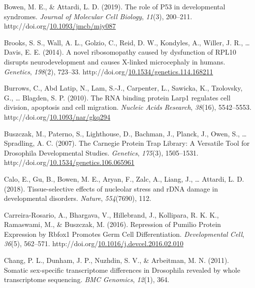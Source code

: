 \documentclass[12pt,oneside]{reedthesis}
\newlength{\cslhangindent}
\newenvironment{CSLReferences}[2] %
 {%
  \setlength{\parindent}{0pt}
  \ifodd #1 \everypar{\setlength{\hangindent}{\cslhangindent}}\ignorespaces\fi
  \ifnum #2 > 0
  \setlength{\parskip}{#2\baselineskip}
  \fi
 }%
 {}
\begin{document}
\begin{CSLReferences}{1}{0}
\leavevmode{}%
Bowen, M. E., \& Attardi, L. D. (2019). The role of P53 in developmental syndromes. \emph{Journal of Molecular Cell Biology}, \emph{11}(3), 200--211. http://doi.org/\href{https://doi.org/10.1093/jmcb/mjy087}{10.1093/jmcb/mjy087}

\leavevmode{}%
Brooks, S. S., Wall, A. L., Golzio, C., Reid, D. W., Kondyles, A., Willer, J. R., \ldots{} Davis, E. E. (2014). A novel ribosomopathy caused by dysfunction of {RPL10} disrupts neurodevelopment and causes {X}-linked microcephaly in humans. \emph{Genetics}, \emph{198}(2), 723--33. http://doi.org/\href{https://doi.org/10.1534/genetics.114.168211}{10.1534/genetics.114.168211}

\leavevmode{}%
Burrows, C., Abd Latip, N., Lam, S.-J., Carpenter, L., Sawicka, K., Tzolovsky, G., \ldots{} Blagden, S. P. (2010). The {RNA} binding protein {Larp1} regulates cell division, apoptosis and cell migration. \emph{Nucleic Acids Research}, \emph{38}(16), 5542--5553. http://doi.org/\href{https://doi.org/10.1093/nar/gkq294}{10.1093/nar/gkq294}

\leavevmode{}%
Buszczak, M., Paterno, S., Lighthouse, D., Bachman, J., Planck, J., Owen, S., \ldots{} Spradling, A. C. (2007). The {Carnegie Protein Trap Library}: {A Versatile Tool} for {Drosophila Developmental Studies}. \emph{Genetics}, \emph{175}(3), 1505--1531. http://doi.org/\href{https://doi.org/10.1534/genetics.106.065961}{10.1534/genetics.106.065961}

\leavevmode{}%
Calo, E., Gu, B., Bowen, M. E., Aryan, F., Zalc, A., Liang, J., \ldots{} Attardi, L. D. (2018). Tissue-selective effects of nucleolar stress and {rDNA} damage in developmental disorders. \emph{Nature}, \emph{554}(7690), 112.

\leavevmode{}%
Carreira-Rosario, A., Bhargava, V., Hillebrand, J., Kollipara, R. K. K., Ramaswami, M., \& Buszczak, M. (2016). Repression of {Pumilio Protein Expression} by {Rbfox1 Promotes Germ Cell Differentiation}. \emph{Developmental Cell}, \emph{36}(5), 562--571. http://doi.org/\href{https://doi.org/10.1016/j.devcel.2016.02.010}{10.1016/j.devcel.2016.02.010}

\leavevmode{}%
Chang, P. L., Dunham, J. P., Nuzhdin, S. V., \& Arbeitman, M. N. (2011). Somatic sex-specific transcriptome differences in {Drosophila} revealed by whole transcriptome sequencing. \emph{BMC Genomics}, \emph{12}(1), 364.


\end{CSLReferences}
\end{document}

